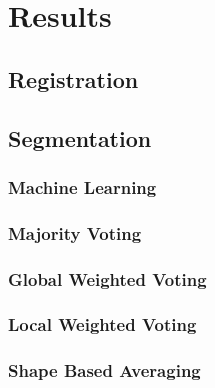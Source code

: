 \section*{Results}
\subsection*{Registration}
\subsection*{Segmentation}
\subsubsection*{Machine Learning}
\subsubsection*{Majority Voting}
\subsubsection*{Global Weighted Voting}
\subsubsection*{Local Weighted Voting}
\subsubsection*{Shape Based Averaging}

